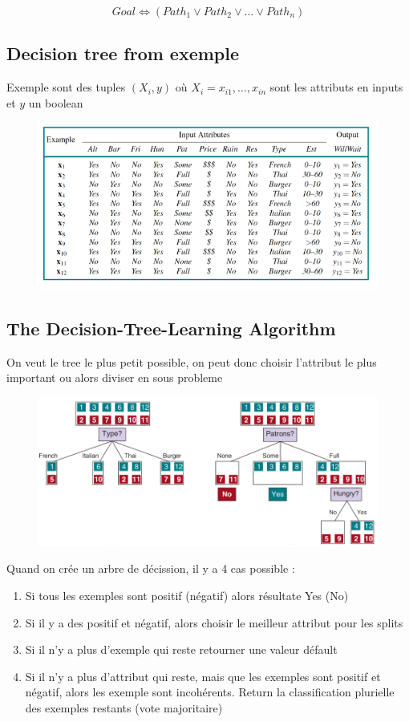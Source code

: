 \documentclass[12pt]{article}
\begin{document}
		\begin{equation}
			Goal \Leftrightarrow (Path_1 \lor Path_2 \lor \dots \lor Path_n)
		\end{equation}
		
	\subsection{Decision tree from exemple}
	
		Exemple sont des tuples $(X_i, y)$ où $X_i = x_{i1},\dots,x_{in}$ sont les attributs en inputs et $y$ un boolean
		
		\begin{figure}[H]
			\centering
			\includegraphics[width=.8\textwidth]{img/DCFE.png}
		\end{figure}
		
	\subsection{The Decision-Tree-Learning Algorithm}
		On veut le tree le plus petit possible, on peut donc choisir l'attribut le plus important ou alors diviser en sous probleme
		\begin{figure}[H]
			\centering
			\includegraphics[width=.8\textwidth]{img/DTLA.png}
		\end{figure}
		
		Quand on crée un arbre de décission, il y a 4 cas possible :
		\begin{enumerate}
			\item Si tous les exemples sont positif (négatif) alors résultate Yes (No)
			\item Si il y a des positif et négatif, alors choisir le meilleur attribut pour les splits
			
			\item Si il n'y a plus d'exemple qui reste retourner une valeur défault
			\item Si il n'y a plus d'attribut qui reste, mais que les exemples sont positif et négatif, alors les exemple sont incohérents. Return la classification plurielle des exemples restants (vote majoritaire)
		\end{enumerate}
		
\end{document}

